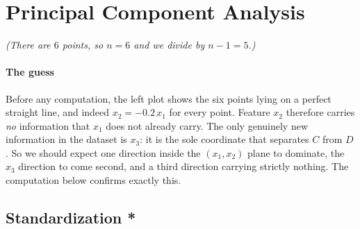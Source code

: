 \documentclass[]{article}
\begin{document}
	\section{Principal Component Analysis}

	\textit{(There are $6$ points, so $n = 6$ and we divide by $n - 1 = 5$.)}

	\paragraph{The guess}\mbox{}

	Before any computation, the left plot shows the six points lying on a perfect straight line, and indeed $x_2 = -0.2\,x_1$ for every point.
	Feature $x_2$ therefore carries \emph{no} information that $x_1$ does not already carry.
	The only genuinely new information in the dataset is $x_3$: it is the sole coordinate that separates $C$ from $D$.
	So we should expect one direction inside the $(x_1, x_2)$ plane to dominate, the $x_3$ direction to come second, and a third direction carrying strictly nothing.
	The computation below confirms exactly this.

	\subsection{Standardization *}
\end{document}
